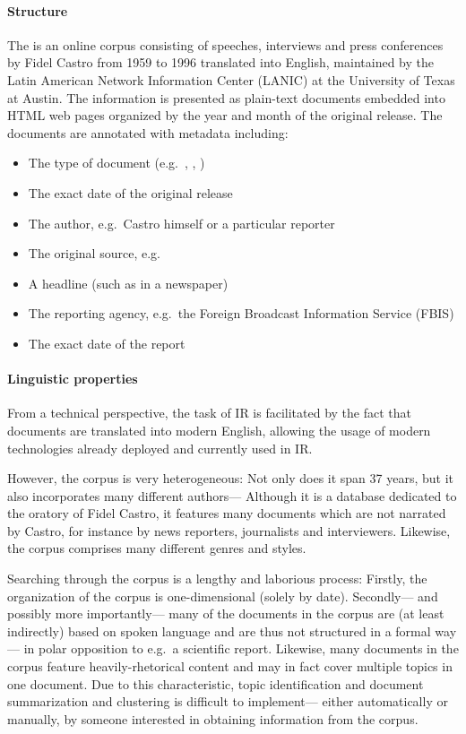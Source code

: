 \paragraph{Structure}
The  is an online corpus consisting of speeches, interviews and press conferences by Fidel Castro from 1959 to 1996 translated into English, maintained by the Latin American Network Information Center (LANIC) at the University of Texas at Austin. The information is presented as plain-text documents embedded into HTML web pages organized by the year and month of the original release. The documents are annotated with metadata including:

\begin{itemize}
\item The type of document (e.g.\ , , )
\item The exact date of the original release
\item The author, e.g.\ Castro himself or a particular reporter
\item The original source, e.g.\ 
\item A headline (such as in a newspaper)
\item The reporting agency, e.g.\ the Foreign Broadcast Information Service (FBIS)
\item The exact date of the report
\end{itemize}

\paragraph{Linguistic properties}
From a technical perspective, the task of IR is facilitated by the fact that documents are translated into modern English, allowing the usage of modern technologies already deployed and currently used in IR.

However, the corpus is very heterogeneous: Not only does it span 37 years, but it also incorporates many different authors--- Although it is a database dedicated to the oratory of Fidel Castro, it features many documents which are not narrated by Castro, for instance by news reporters, journalists and interviewers. Likewise, the corpus comprises many different genres and styles.

Searching through the corpus is a lengthy and laborious process: Firstly, the organization of the corpus is one-dimensional (solely by date). Secondly--- and possibly more importantly--- many of the documents in the corpus are (at least indirectly) based on spoken language and are thus not structured in a formal way--- in polar opposition to e.g.\ a scientific report. Likewise, many documents in the corpus feature heavily-rhetorical content and may in fact cover multiple topics in one document. Due to this characteristic, topic identification and document summarization and clustering is difficult to implement--- either automatically or manually, by someone interested in obtaining information from the corpus.